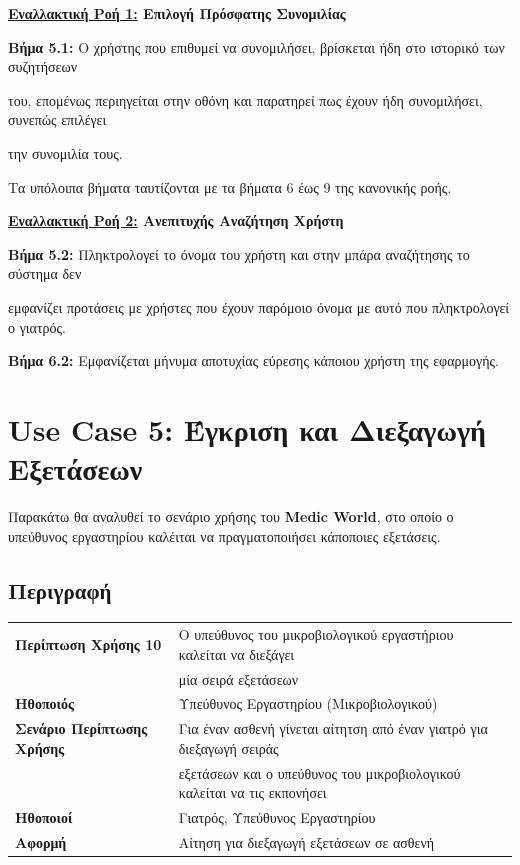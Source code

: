 \documentclass{article}
\newcommand\T{\rule{0pt}{2.6ex}}       %
\newcommand\B{\rule[-1.2ex]{0pt}{0pt}}
\begin{document}
\textbf{\underline{Εναλλακτική Ροή 1:} Επιλογή Πρόσφατης Συνομιλίας} \vspace{0.2cm}
\par\textbf{Βήμα 5.1:} Ο χρήστης που επιθυμεί να συνομιλήσει, βρίσκεται ήδη στο ιστορικό των συζητήσεων \par του, επομένως περιηγείται στην οθόνη και παρατηρεί πως έχουν ήδη συνομιλήσει, συνεπώς επιλέγει \par την συνομιλία τους.  \vspace{0.1cm}

\par Τα υπόλοιπα βήματα ταυτίζονται με τα βήματα 6 έως 9 της κανονικής ροής. \vspace{0.2cm}

\textbf{\underline{Εναλλακτική Ροή 2:} Ανεπιτυχής Αναζήτηση Χρήστη} \vspace{0.2cm}
\par \textbf{Βήμα 5.2:} Πληκτρολογεί το όνομα του χρήστη και στην μπάρα αναζήτησης το σύστημα δεν \par εμφανίζει προτάσεις με χρήστες που έχουν παρόμοιο όνομα με αυτό που πληκτρολογεί ο γιατρός. \vspace{0.1cm}
\par \textbf{Βήμα 6.2:} Εμφανίζεται μήνυμα αποτυχίας εύρεσης κάποιου χρήστη της εφαρμογής. \vspace{0.1cm}

\section{Use Case 5: Έγκριση και Διεξαγωγή Εξετάσεων}

Παρακάτω θα αναλυθεί το σενάριο χρήσης του \textbf{Medic World}, στο οποίο ο υπεύθυνος εργαστηρίου καλέιται να πραγματοποιήσει κάποποιες εξετάσεις.

\subsection{Περιγραφή}

\begin{center}
     \begin{tabular}{|l|l|}
     \hline
      \textbf{Περίπτωση Χρήσης 10} & Ο υπεύθυνος του μικροβιολογικού εργαστήριου καλείται να διεξάγει\T\\& μία σειρά εξετάσεων\B \\ 
      \hline
      \textbf{Ηθοποιός} & Υπεύθυνος Εργαστηρίου (Μικροβιολογικού) \T\B \\
      \hline
      \textbf{Σενάριο Περίπτωσης Χρήσης} & Για έναν ασθενή γίνεται αίτητση από έναν γιατρό για διεξαγωγή σειράς\T\\& εξετάσεων και ο υπεύθυνος του μικροβιολογικού καλείται να τις εκπονήσει\B\\
      \hline
      \textbf{Ηθοποιοί} & Γιατρός, Υπεύθυνος Εργαστηρίου \T\B \\
      \hline
      \textbf{Αφορμή} &  Αίτηση για διεξαγωγή εξετάσεων σε ασθενή\T\B \\
      \hline
     \end{tabular}
 \end{center}
 
\end{document}
